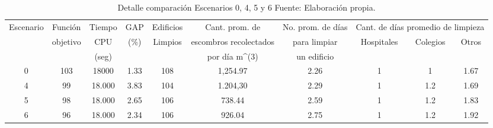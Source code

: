\documentclass[letterpaper,conference]{IEEEtran}
\begin{document}
\begin{table}[h!]
\resizebox{18cm}{!} {
\begin{tabular}{c|c|c|c|c|c|c|c|c|c}
\hline
\multirow{3}{*}{Escenario} & Función                   & Tiempo & GAP                   & Edificios                & Cant. prom. de                 & No. prom. de días & \multicolumn{3}{c|}{Cant. de días promedio de limpieza}                          \\ \cline{8-10} 
                           & \multirow{2}{*}{objetivo} & CPU    & \multirow{2}{*}{(\%)} & \multirow{2}{*}{Limpios} & escombros recolectados         & para limpiar      & \multirow{2}{*}{Hospitales} & \multirow{2}{*}{Colegios} & \multirow{2}{*}{Otros} \\
                           &                           & (seg)  &                       &                          & por día m\textasciicircum{}(3) & un edificio       &                             &                           &                        \\ \hline
0                          & 103                       & 18000  & 1.33                  & 108                      & 1,254.97                       & 2.26              & 1                           & 1                         & 1.67                   \\ 
4                          & 99                        & 18.000 & 3.83                  & 104                      & 1.204,30                       & 2.29              & 1                           & 1.2                       & 1.69                   \\ 
5                          & 98                        & 18.000 & 2.65                  & 106                      & 738.44                         & 2.59              & 1                           & 1.2                       & 1.83                   \\ 
6                          & 96                        & 18.000 & 2.34                  & 106                      & 926.04                         & 2.75              & 1                           & 1.2                       & 1.92                   \\ \hline
\end{tabular}
}
\caption{Detalle comparación Escenarios 0, 4, 5 y 6 Fuente: Elaboración propia. }
\label{tab:comp03}
\end{table}

\end{document}
